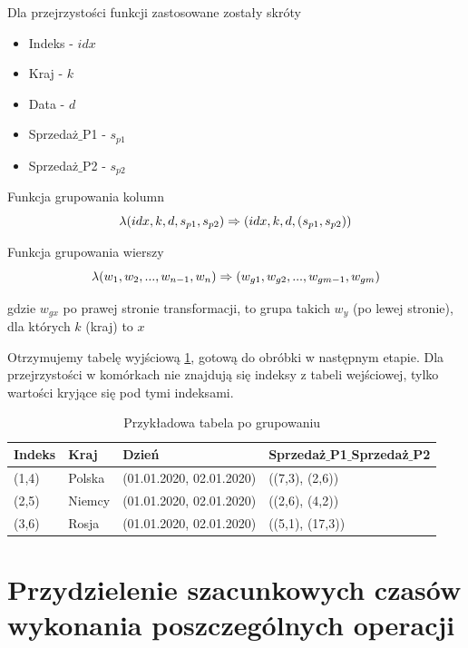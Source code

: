 \documentclass[brudnopis]{xmgr}
\begin{document}
Dla przejrzystości funkcji zastosowane zostały skróty
\medskip

\begin{itemize}
    \item Indeks - $idx$
    \item Kraj - $k$
    \item Data - $d$
    \item Sprzedaż$\_$P1 - $s_{p1}$
    \item Sprzedaż$\_$P2 - $s_{p2}$
\end{itemize}
\medskip

Funkcja grupowania kolumn
\begin{equation} \label{eq:example-col-agg}
\lambda (idx, k, d, s_{p1}, s_{p2}) \\ \Rightarrow (idx, k, d, (s_{p1}, s_{p2}))
\end{equation}
\medskip

Funkcja grupowania wierszy
\begin{equation} \label{eq:example-row-agg}
\lambda (w_1, w_2, ..., w_{n-1}, w_n) \\ \Rightarrow (w_{g1}, w_{g2}, ..., w_{gm-1}, w_{gm}) 
\end{equation}
\medskip

gdzie $w_{gx}$ po prawej stronie transformacji, to grupa takich $w_y$ (po lewej stronie), dla których $k$ (kraj) to $x$
\medskip

Otrzymujemy tabelę wyjściową \ref{tab:example-output}, gotową do obróbki w następnym etapie.
Dla przejrzystości w komórkach nie znajdują się indeksy z tabeli wejściowej, tylko wartości kryjące się pod tymi indeksami.

\begin{table}[!tbh]
\begin{tabular}{|l|l|l|l|} \hline
Indeks & Kraj & Dzień & Sprzedaż$\_$P1$\_$Sprzedaż$\_$P2 \\ \hline
(1,4) & Polska & (01.01.2020, 02.01.2020) & ((7,3), (2,6)) \\ \hline
(2,5) & Niemcy & (01.01.2020, 02.01.2020) & ((2,6), (4,2)) \\ \hline
(3,6) & Rosja & (01.01.2020, 02.01.2020) & ((5,1), (17,3)) \\ \hline
\end{tabular}
\caption{Przykładowa tabela po grupowaniu\label{tab:example-output}}
\end{table}
\newpage


\section{Przydzielenie szacunkowych czasów wykonania poszczególnych operacji}
\end{document}
